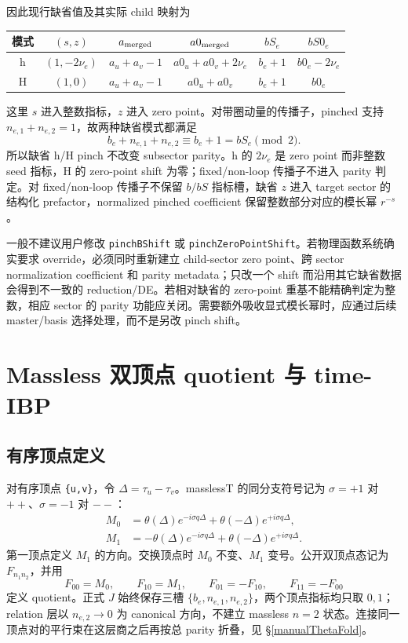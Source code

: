 ﻿\documentclass[a4paper,11pt]{article}
\begin{document}
因此现行缺省值及其实际 child 映射为
\begin{center}
\begin{tabular}{c|c|c|c|c|c}
\toprule
模式 & $(s,z)$ & $a_{\rm merged}$ & $a0_{\rm merged}$ & $bS_e$ & $bS0_e$\\
\midrule
h & $(1,-2\nu_e)$ & $a_u+a_v-1$ & $a0_u+a0_v+2\nu_e$ & $b_e+1$ & $b0_e-2\nu_e$\\
H & $(1,0)$ & $a_u+a_v-1$ & $a0_u+a0_v$ & $b_e+1$ & $b0_e$\\
\bottomrule
\end{tabular}
\end{center}
这里 $s$ 进入整数指标，$z$ 进入 zero point。对带圈动量的传播子，pinched 支持 $n_{e,1}+n_{e,2}=1$，故两种缺省模式都满足
\begin{equation}
 b_e+n_{e,1}+n_{e,2}\equiv b_e+1=bS_e\pmod 2.
\end{equation}
所以缺省 h/H pinch 不改变 subsector parity。h 的 $2\nu_e$ 是 zero point 而非整数 seed 指标，H 的 zero-point shift 为零；fixed/non-loop 传播子不进入 parity 判定。对 fixed/non-loop 传播子不保留 $b/bS$ 指标槽，缺省 $z$ 进入 target sector 的结构化 prefactor，normalized pinched coefficient 保留整数部分对应的模长幂 $r^{-s}$。

一般不建议用户修改 \texttt{pinchBShift} 或 \texttt{pinchZeroPointShift}。若物理函数系统确实要求 override，必须同时重新建立 child-sector zero point、跨 sector normalization coefficient 和 parity metadata；只改一个 shift 而沿用其它缺省数据会得到不一致的 reduction/DE。若相对缺省的 zero-point 重基不能精确判定为整数，相应 sector 的 parity 功能应关闭。需要额外吸收显式模长幂时，应通过后续 master/basis 选择处理，而不是另改 pinch shift。

\section{Massless 双顶点 quotient 与 time-IBP}

\subsection{有序顶点定义}

对有序顶点 \texttt{\{u,v\}}，令 $\Delta=\tau_u-\tau_v$。masslessT 的同分支符号记为 $\sigma=+1$ 对 $++$、$\sigma=-1$ 对 $--$：
\begin{align}
 M_0&=\theta(\Delta)e^{-i\sigma q\Delta}
      +\theta(-\Delta)e^{+i\sigma q\Delta},\\
 M_1&=-\theta(\Delta)e^{-i\sigma q\Delta}
      +\theta(-\Delta)e^{+i\sigma q\Delta}.
 \label{masslessM01}
\end{align}
第一顶点定义 $M_1$ 的方向。交换顶点时 $M_0$ 不变、$M_1$ 变号。公开双顶点态记为 $F_{n_1n_2}$，并用
\begin{equation}
 F_{00}=M_0,\qquad F_{10}=M_1,\qquad
 F_{01}=-F_{10},\qquad F_{11}=-F_{00}
 \label{masslessDoubleEndpoint}
\end{equation}
定义 quotient。正式 $J$ 始终保存三槽 $\{b_e,n_{e,1},n_{e,2}\}$，两个顶点指标均只取 $0,1$；relation 层以 $n_{e,2}\to0$ 为 canonical 方向，不建立 massless $n=2$ 状态。连接同一顶点对的平行束在这层商之后再按总 parity 折叠，见 \S\ref{manualThetaFold}。
\end{document}
